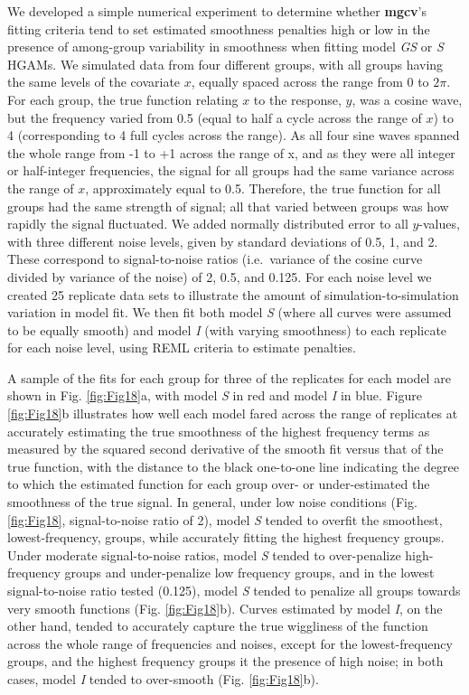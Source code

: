 \documentclass[12pt]{article}
\begin{document}
We developed a simple numerical experiment to determine whether
\textbf{mgcv}'s fitting criteria tend to set estimated smoothness
penalties high or low in the presence of among-group variability in
smoothness when fitting model \emph{GS} or \emph{S} HGAMs. We simulated
data from four different groups, with all groups having the same levels
of the covariate \(x\), equally spaced across the range from 0 to
\(2\pi\). For each group, the true function relating \(x\) to the
response, \(y\), was a cosine wave, but the frequency varied from 0.5
(equal to half a cycle across the range of \(x\)) to 4 (corresponding to
4 full cycles across the range). As all four sine waves spanned the
whole range from -1 to +1 across the range of x, and as they were all
integer or half-integer frequencies, the signal for all groups had the
same variance across the range of \(x\), approximately equal to 0.5.
Therefore, the true function for all groups had the same strength of
signal; all that varied between groups was how rapidly the signal
fluctuated. We added normally distributed error to all \(y\)-values,
with three different noise levels, given by standard deviations of 0.5,
1, and 2. These correspond to signal-to-noise ratios (i.e.~variance of
the cosine curve divided by variance of the noise) of 2, 0.5, and 0.125.
For each noise level we created 25 replicate data sets to illustrate the
amount of simulation-to-simulation variation in model fit. We then fit
both model \emph{S} (where all curves were assumed to be equally smooth)
and model \emph{I} (with varying smoothness) to each replicate for each
noise level, using REML criteria to estimate penalties.

A sample of the fits for each group for three of the replicates for each
model are shown in Fig. \ref{fig:Fig18}a, with model \emph{S} in red and
model \emph{I} in blue. Figure \ref{fig:Fig18}b illustrates how well
each model fared across the range of replicates at accurately estimating
the true smoothness of the highest frequency terms as measured by the
squared second derivative of the smooth fit versus that of the true
function, with the distance to the black one-to-one line indicating the
degree to which the estimated function for each group over- or
under-estimated the smoothness of the true signal. In general, under low
noise conditions (Fig. \ref{fig:Fig18}, signal-to-noise ratio of 2),
model \emph{S} tended to overfit the smoothest, lowest-frequency,
groups, while accurately fitting the highest frequency groups. Under
moderate signal-to-noise ratios, model \emph{S} tended to over-penalize
high-frequency groups and under-penalize low frequency groups, and in
the lowest signal-to-noise ratio tested (0.125), model \emph{S} tended
to penalize all groups towards very smooth functions (Fig.
\ref{fig:Fig18}b). Curves estimated by model \emph{I}, on the other
hand, tended to accurately capture the true wiggliness of the function
across the whole range of frequencies and noises, except for the
lowest-frequency groups, and the highest frequency groups it the
presence of high noise; in both cases, model \emph{I} tended to
over-smooth (Fig. \ref{fig:Fig18}b).
\end{document}
